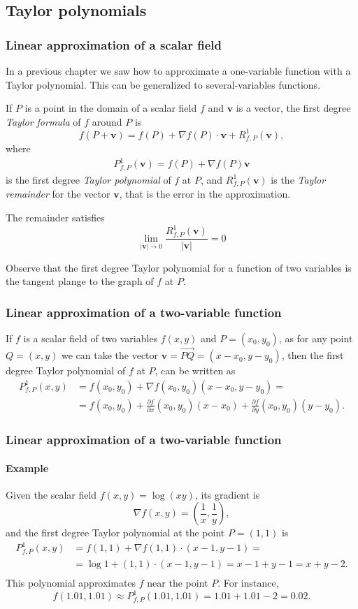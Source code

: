\subsection{Taylor polynomials}
\begin{frame}
\frametitle{Linear approximation of a scalar field}
In a previous chapter we saw how to approximate a one-variable function with a Taylor polynomial.  
This can be generalized to several-variables functions. 

If $P$ is a point in the domain of a scalar field $f$ and $\mathbf{v}$ is a vector, the first degree \emph{Taylor formula} of $f$ around $P$ is
\[
f(P+\mathbf{v}) = f(P) + \nabla f(P)\cdot \mathbf{v} +R^1_{f,P}(\mathbf{v}),
\]
where
\begin{align*}
P^1_{f,P}(\mathbf{v}) = f(P)+\nabla f(P)\mathbf{v}
\end{align*}
is the first degree \emph{Taylor polynomial} of $f$ at $P$, and $R^1_{f,P}(\mathbf{v})$ is the \emph{Taylor remainder} for the vector $\mathbf{v}$, that is the error in the approximation.

The remainder satisfies
\[
\lim_{|\mathbf{v}|\rightarrow 0} \frac{R^1_{f,P}(\mathbf{v})}{|\mathbf{v}|} = 0
\]

Observe that the first degree Taylor polynomial for a function of two variables is the tangent plange to the graph of $f$ at $P$.
\end{frame}


\begin{frame}
\frametitle{Linear approximation of a two-variable function}
If $f$ is a scalar field of two variables $f(x,y)$ and $P=(x_0,y_0)$, as for any point $Q=(x,y)$ we can take the vector $\mathbf{v}=\vec{PQ}=(x-x_0,y-y_0)$, then the first degree Taylor polynomial of $f$ at $P$, can be written as
\begin{align*}
P^1_{f,P}(x,y) &= f(x_0,y_0)+\nabla f(x_0,y_0)(x-x_0,y-y_0) =\\
&= f(x_0,y_0)+\frac{\partial f}{\partial x}(x_0,y_0)(x-x_0)+\frac{\partial f}{\partial y}(x_0,y_0)(y-y_0).
\end{align*}
\end{frame}


\begin{frame}
\frametitle{Linear approximation of a two-variable function}
\framesubtitle{Example}
Given the scalar field $f(x,y)=\log(xy)$, its gradient is
\[
\nabla f(x,y) = \left(\frac{1}{x},\frac{1}{y}\right),
\]
and the first degree Taylor polynomial at the point $P=(1,1)$ is
\begin{align*}
P^1_{f,P}(x,y) &= f(1,1) +\nabla f(1,1)\cdot (x-1,y-1) = \\
&= \log 1+(1,1)\cdot(x-1,y-1) = x-1+y-1 = x+y-2.\\
\end{align*}
This polynomial approximates $f$ near the point $P$.
For instance,
\[
f(1.01,1.01) \approx P^1_{f,P}(1.01,1.01) = 1.01+1.01-2 = 0.02.
\]
\end{frame}


